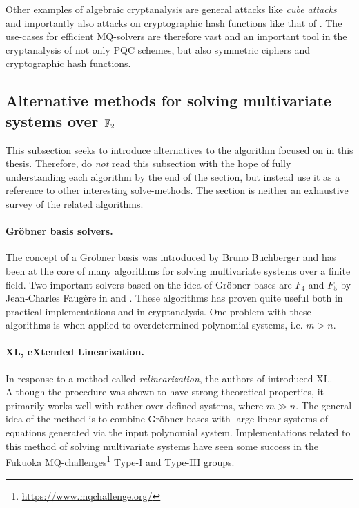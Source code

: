 Other examples of algebraic cryptanalysis are general attacks like \textit{cube attacks} \cite{Videau2011} and importantly also attacks on cryptographic hash functions like that of \cite{fse-2011-23547}. The use-cases for efficient MQ-solvers are therefore vast and an important tool in the cryptanalysis of not only PQC schemes, but also  symmetric ciphers and cryptographic hash functions. 


\subsection{Alternative methods for solving multivariate systems over $\mathbb{F}_2$}
This subsection seeks to introduce alternatives to the algorithm focused on in this thesis. Therefore, do \textit{not} read this subsection with the hope of fully understanding each algorithm by the end of the section, but instead use it as a reference to other interesting solve-methods. The section is neither an exhaustive survey of the related algorithms.

\paragraph{Gröbner basis solvers.} The concept of a Gröbner basis was introduced by Bruno Buchberger and has been at the core of many algorithms for solving multivariate systems over a finite field. Two important solvers based on the idea of Gröbner bases are $F_4$ and $F_5$ by Jean-Charles Faugère in \cite{FAUGERE199961} and \cite{10.1145/780506.780516}. These algorithms has proven quite useful both in practical implementations and in cryptanalysis. One problem with these algorithms is when applied to overdetermined polynomial systems, i.e. $m > n$.

\paragraph{XL, eXtended Linearization.} In response to a method called \textit{relinearization}, the authors of \cite{eurocrypt-2000-2187} introduced XL. Although the procedure was shown to have strong theoretical properties, it primarily works well with rather over-defined systems, where $m \gg n$. The general idea of the method is to combine Gröbner bases with large linear systems of equations generated via the input polynomial system. Implementations related to this method of solving multivariate systems have seen some success in the Fukuoka MQ-challenges\footnote{\url{https://www.mqchallenge.org/}} Type-I and Type-III groups.

